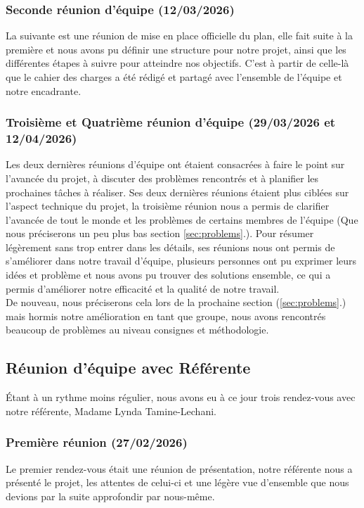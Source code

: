 \documentclass[12pt,a4paper]{article}
\begin{document}
\subsubsection{Seconde réunion d'équipe (12/03/2026)}
La suivante est une réunion de mise en place officielle du plan, elle fait suite à la première et nous avons pu définir une structure pour notre projet,
ainsi que les différentes étapes à suivre pour atteindre nos objectifs. C'est à partir de celle-là que le cahier des charges
a été rédigé et partagé avec l'ensemble de l'équipe et notre encadrante.

\subsubsection{Troisième et Quatrième réunion d'équipe (29/03/2026 et 12/04/2026)}
Les deux dernières réunions d'équipe ont étaient consacrées à faire le point sur l'avancée du projet, 
à discuter des problèmes rencontrés et à planifier les prochaines tâches à réaliser.
Ses deux dernières réunions étaient plus ciblées sur l'aspect technique du projet, la troisième réunion nous a permis de clarifier
l'avancée de tout le monde et les problèmes de certains membres de l'équipe (Que nous préciserons un peu plus bas section \ref{sec:problems}.).\smallbreak
Pour résumer légèrement sans trop entrer dans les détails, ses réunions nous ont permis de s'améliorer dans notre travail d'équipe,
plusieurs personnes ont pu exprimer leurs idées et problème et nous avons pu trouver des solutions ensemble,
ce qui a permis d'améliorer notre efficacité et la qualité de notre travail.\\
De nouveau, nous préciserons cela lors de la prochaine section (\ref{sec:problems}.) 
mais hormis notre amélioration en tant que groupe, nous avons rencontrés beaucoup de problèmes au niveau consignes et méthodologie.

\subsection{Réunion d'équipe avec Référente}
Étant à un rythme moins régulier, nous avons eu à ce jour trois rendez-vous avec notre référente, Madame Lynda Tamine-Lechani.
\subsubsection{Première réunion (27/02/2026)}
Le premier rendez-vous était une réunion de présentation, notre référente nous a présenté le projet, les attentes de celui-ci et
une légère vue d'ensemble que nous devions par la suite approfondir par nous-même.\smallbreak
\end{document}
